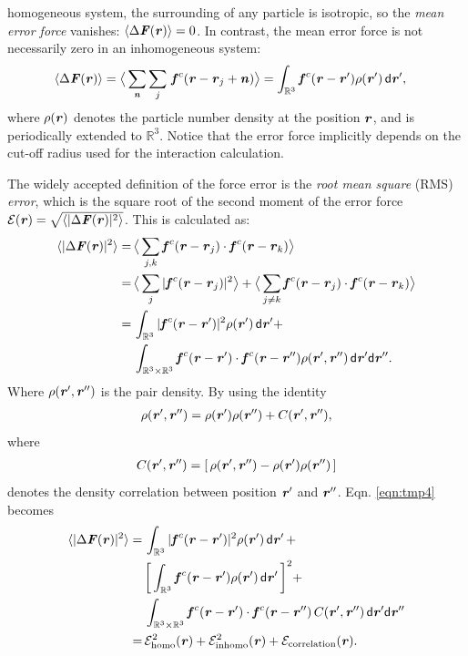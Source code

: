 \documentclass[aps,pre,preprint]{revtex4}
\renewcommand{\v}[1]{\textbf{\textit{#1}}}
\renewcommand{\d}[1]{\textsf{#1}}
\begin{document}
homogeneous system, the surrounding of any particle is isotropic, so
the \emph{mean error force} vanishes: $\langle\Delta\v F(\v r)\rangle
= 0$. In contrast, the mean error force is not necessarily zero in an
inhomogeneous system:
\begin{align} \label{eqn:tmp3} %
  \langle\Delta\v F(\v r)\rangle
  &=
  \big\langle
  \sum_{\v n}\sum_{j}\, \v f^c(\v r - \v r_j + \v n)
  \big\rangle 
  =
  \int_{\mathbb R^3}\v f^c(\v r - \v r')\rho(\v r')\,\d d\v r',
\end{align}
where $\rho(\v r)$ denotes the particle number density at the position
$\v r$, and is periodically extended to $\mathbb R^3$. Notice that the
error force implicitly depends on the cut-off radius used for the
interaction calculation.

The widely accepted definition of the force error is the \emph{root
  mean square} (RMS) \emph{error}, which is the square root of the second
moment of the error force $\mathcal E(\v r) =
\sqrt{\langle\vert\Delta\v F(\v r)\vert^2\rangle}$. This is 
calculated as:
\begin{align} \nonumber
  \langle\vert\Delta\v F(\v r)\vert^2\rangle
  =\,&
  \big\langle\sum_{j,k}\v f^c(\v r - \v r_j)\cdot\v f^c(\v r - \v r_k)\big\rangle \\ \nonumber
  =\,&
  \big\langle\sum_j\vert\v f^c(\v r - \v r_j)\vert^2\big\rangle +
  \big\langle\sum_{j\neq k}\v f^c(\v r - \v r_j)\cdot\v f^c(\v r - \v r_k)\big\rangle \\ \nonumber
  =\,&
  \int_{\mathbb R^3}\vert\v f^c(\v r - \v r')\vert^2\rho(\v r')\,\d d\v r'
  + \\\label{eqn:tmp4}
  \,&
  \int_{\mathbb R^3\times\mathbb R^3}\v f^c(\v r - \v r')\cdot\v f^c(\v r - \v r'')\rho(\v r', \v r'')\,\d d\v r'\d d\v r''.
\end{align}
Where  $\rho(\v r', \v r'')$ is the pair density. By using the identity
\begin{align}  \label{eqn:tmp7}
  \rho(\v r', \v r'')
  = \rho(\v r')\rho(\v r'') + C (\v r', \v r''),
\end{align}
where 
\begin{align}
C (\v r', \v r'') = [\,\rho(\v r', \v r'') -  \rho(\v r')\rho(\v r'')\,]
\end{align}
denotes the density correlation between position $\v r'$ and $\v
r''$. Eqn. \eqref{eqn:tmp4} becomes
\begin{align} \nonumber
  \langle\vert\Delta\v F(\v r)\vert^2\rangle
  = &\,
  \int_{\mathbb R^3}\vert\v f^c(\v r - \v r')\vert^2\rho(\v r')\,\d d\v r' \,+ \\\nonumber
  &\,
  \bigg[\int_{\mathbb R^3}\v f^c(\v r - \v r')\rho(\v r')\,\d d\v r'\,\bigg]^2 + \\\nonumber
  &\,
  \int_{\mathbb R^3\times\mathbb R^3}\v f^c(\v r - \v r')\cdot\v f^c(\v r - \v r'')\,C(\v r', \v r'')\,\d d\v r'\d d\v r'' \\\label{eqn:tmp5}
  = &\,
  \mathcal E^2_{\textrm{homo}}(\v r) +
  \mathcal E^2_{\textrm{inhomo}}(\v r) +
  \mathcal E_{\textrm{correlation}}(\v r).
\end{align}
\end{document}
